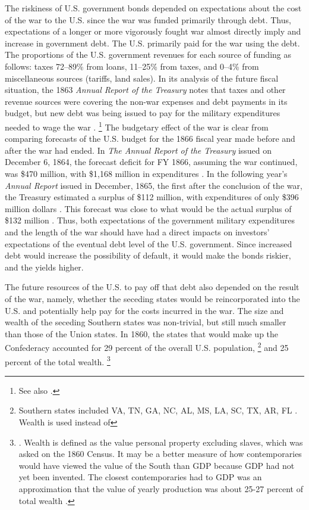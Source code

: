 The riskiness of U.S. government bonds depended on expectations about the cost of the war to the U.S. since the war was funded primarily through debt.
Thus, expectations of a longer or more vigorously fought war almost directly imply and increase in government debt.
The U.S. primarily paid for the war using the debt.
The proportions of the U.S. government revenues for each source of funding as follows: taxes 72--89\% from loans, 11--25\% from taxes, and 0--4\% from miscellaneous sources (tariffs, land sales).
In its analysis of the future fiscal situation, the 1863 \textit{Annual Report of the Treasury} notes that taxes and other revenue sources were covering the non-war expenses and debt payments in its budget, but new debt was being issued to pay for the military expenditures needed to wage the war \parencite[10-13]{Treasury1863}.
\footnote{See also \textcite[][14]{Godfrey1976}.}
The budgetary effect of the war is clear from  comparing forecasts of the U.S. budget for the 1866 fiscal year made before and after the war had ended.
In \textit{The Annual Report of the  Treasury} issued on December 6, 1864, the forecast deficit for FY 1866, assuming the war continued, was \$470 million, with \$1,168 million in expenditures \parencite[13]{Treasury1864}.
In the following year's \textit{Annual Report} issued in December, 1865, the first after the conclusion of the war, the Treasury estimated a surplus of \$112 million, with expenditures of only \$396 million dollars \parencite{Treasury1865}.
This forecast was close to what would be the actual surplus of \$132 million \parencite[2]{Treasury1866}.
Thus, both expectations of the government military expenditures and the length of the war should have had a direct impacts on investors' expectations of the eventual debt level of the U.S. government.
Since increased debt would increase the possibility of default, it would make the bonds riskier, and the yields higher.

The future resources of the U.S. to pay off that debt also depended on the result of the war, namely, whether the seceding states would be reincorporated into the U.S. and potentially help pay for the costs incurred in the war.
The size and wealth of the seceding Southern states was non-trivial, but still much smaller than those of the Union states.
In 1860, the states that would make up the Confederacy accounted for 29 percent of the overall U.S. population,%
\footnote{
  Southern states included VA, TN, GA, NC, AL, MS, LA, SC, TX, AR, FL \textcite[5]{Eicher2001}.
  Wealth is used instead of
}
and 25 percent of the total wealth.%
\footnote{
  \textcite[12]{Elder1865}. Wealth is defined as the value personal property excluding slaves, which was asked on the 1860 Census.
  It may be a better measure of how contemporaries would have viewed the value of the South than GDP because GDP had not yet been invented.
  The closest contemporaries had to GDP was an approximation that the value of yearly production was about 25-27 percent of total wealth \parencites[7]{Elder1865}[24]{Treasury1865}.
}

